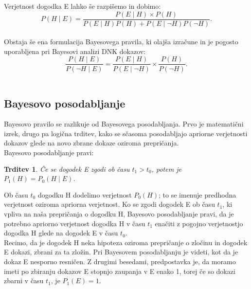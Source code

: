 \documentclass[12pt,a4paper]{amsart}
\theoremstyle{definition} %
\theoremstyle{plain} %
\newtheorem{trditev}[definicija]{Trditev}
\begin{document}
Verjetnost dogodka E lahko še razpišemo in dobimo:
\begin{equation}\label{eq:b_pravilo}
    P(H \mid E) = \frac{P(E \mid H) \times P(H)}{P(E \mid H)P(H) + P(E \mid \neg H)P(\neg H)}.
\end{equation} \\

Obstaja še ena formulacija Bayesovega pravila, ki olajša izračune in je pogosto uporabljena pri Bayesovi analizi DNK dokazov:
\begin{equation}\label{eq:b_pravilo_DNK}
    \frac{P(H \mid E)}{P(\neg H \mid E)} = \frac{P(E \mid H)}{P(E \mid \neg H)} \times \frac{P(H)}{P(\neg H)}.
\end{equation}\\

\subsection{Bayesovo posodabljanje}
Bayesovo pravilo se razlikuje od Bayesovega posodabljanja. Prvo je matematični izrek, drugo pa logična trditev, kako se sčasoma posodabljajo 
apriorne verjetnosti dokazov glede na novo zbrane dokaze oziroma prepričanja. \\

Bayesovo posodabljanje pravi:
\begin{trditev}
Če se dogodek E zgodi ob času $t_1 > t_0$, potem je $P_1(H) = P_0(H \mid E)$.
\end{trditev}

Ob času $t_0$ dogodku H dodelimo verjetnost $P_0(H)$; to se imenuje predhodna verjetnost oziroma apriorna verjetnost. Ko se zgodi dogodek E 
ob času $t_1$, ki vpliva na naša prepričanja o dogodku H, Bayesovo posodabljanje pravi, da je potrebno apriorno verjetnost dogodka H v času $t_1$ 
enačiti z pogojno verjetnostjo dogodka H glede na dogodek E v času $t_0$. \\

Recimo, da je dogodek H neka hipoteza oziroma prepričanje o zločinu in dogodek E dokazi, zbrani za ta zložin. Pri Bayesovem posodabljanju je videti, 
kot da je dokaz E nesporno resničen. Z drugimi besedami, predpostavka je, da moramo imeti po zbiranju dokazov E stopnjo zaupanja v E enako 1, 
torej če so dokazi zbarni v času $t_1$, je $P_1(E)=1$.

\end{document}
